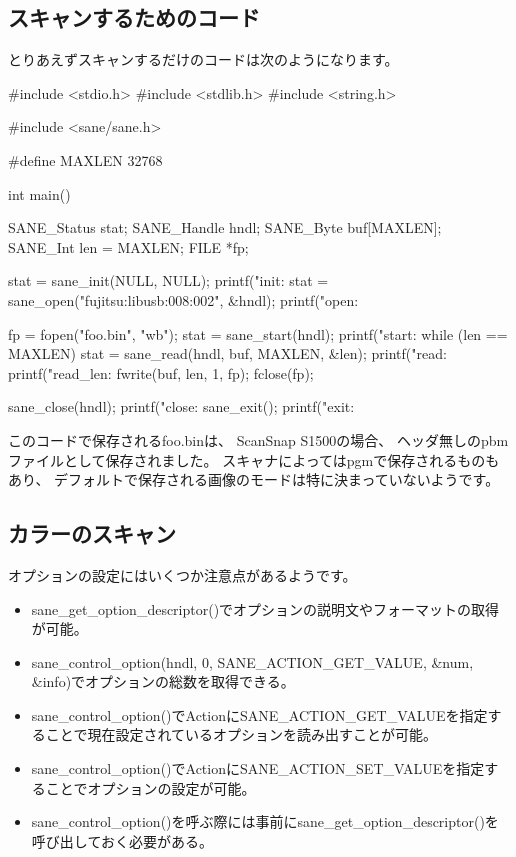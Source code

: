 \documentclass[mingoth,a4paper]{jsarticle}
\begin{document}
\subsection{スキャンするためのコード}

とりあえずスキャンするだけのコードは次のようになります。

\begin{commandline}
#include <stdio.h>
#include <stdlib.h>
#include <string.h>

#include <sane/sane.h>


#define MAXLEN 32768

int main()
{
  SANE_Status stat;
  SANE_Handle hndl;
  SANE_Byte buf[MAXLEN];
  SANE_Int len = MAXLEN;
  FILE *fp;

  stat = sane_init(NULL, NULL);
  printf("init: %
  stat = sane_open("fujitsu:libusb:008:002", &hndl);
  printf("open: %

  fp = fopen("foo.bin", "wb");
  stat = sane_start(hndl);
  printf("start: %
  while (len == MAXLEN) {
    stat = sane_read(hndl, buf, MAXLEN, &len);
    printf("read: %
    printf("read_len: %
    fwrite(buf, len, 1, fp);
  }
  fclose(fp);

  sane_close(hndl);
  printf("close: %
  sane_exit();
  printf("exit: %
}
\end{commandline}

このコードで保存されるfoo.binは、
ScanSnap S1500の場合、
ヘッダ無しのpbmファイルとして保存されました。
スキャナによってはpgmで保存されるものもあり、
デフォルトで保存される画像のモードは特に決まっていないようです。


\subsection{カラーのスキャン}

オプションの設定にはいくつか注意点があるようです。

\begin{itemize}
\item sane\_get\_option\_descriptor()でオプションの説明文やフォーマットの取得が可能。
\item sane\_control\_option(hndl, 0, SANE\_ACTION\_GET\_VALUE, \&num, \&info)でオプションの総数を取得できる。
\item sane\_control\_option()でActionにSANE\_ACTION\_GET\_VALUEを指定することで現在設定されているオプションを読み出すことが可能。
\item sane\_control\_option()でActionにSANE\_ACTION\_SET\_VALUEを指定することでオプションの設定が可能。
\item sane\_control\_option()を呼ぶ際には事前にsane\_get\_option\_descriptor()を呼び出しておく必要がある。 
\end{itemize}
\end{document}
